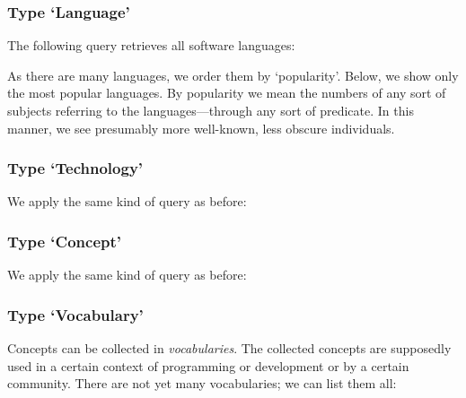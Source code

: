 
\subsubsection{Type `Language'}

The following query retrieves all software languages:


\noindent
As there are many languages, we order them by `popularity'. Below, we
show only the most popular languages. By popularity we mean the
numbers of any sort of subjects referring to the languages---through
any sort of predicate. In this manner, we see presumably more
well-known, less obscure individuals.



\subsubsection{Type `Technology'}

We apply the same kind of query as before:




\subsubsection{Type `Concept'}

We apply the same kind of query as before:




\subsubsection{Type `Vocabulary'}
\label{S:vocabulary}

Concepts can be collected in \emph{vocabularies}. The collected
concepts are supposedly used in a certain context of programming or
development or by a certain community. There are not yet many
vocabularies; we can list them all:


